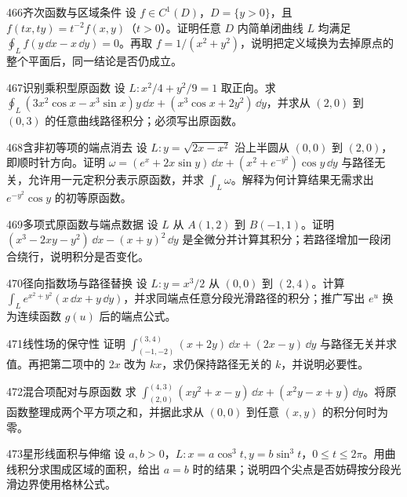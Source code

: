 \begin{exercise}{466}{齐次函数与区域条件}
设 $f\in C^1(D)$，$D=\{y>0\}$，且 $f(tx,ty)=t^{-2}f(x,y)$（$t>0$）。证明任意 $D$ 内简单闭曲线 $L$ 均满足 $\oint_Lf(y\,\dd x-x\,\dd y)=0$。再取 $f=1/(x^2+y^2)$，说明把定义域换为去掉原点的整个平面后，同一结论是否仍成立。
\end{exercise}

\begin{exercise}{467}{识别乘积型原函数}
设 $L:x^2/4+y^2/9=1$ 取正向。求 $\oint_L(3x^2\cos x-x^3\sin x)y\,\dd x+(x^3\cos x+2y^2)\,\dd y$，并求从 $(2,0)$ 到 $(0,3)$ 的任意曲线路径积分；必须写出原函数。
\end{exercise}

\begin{exercise}{468}{含非初等项的端点消去}
设 $L:y=\sqrt{2x-x^2}$ 沿上半圆从 $(0,0)$ 到 $(2,0)$，即顺时针方向。证明 $\omega=(e^x+2x\sin y)\,\dd x+(x^2+e^{-y^2})\cos y\,\dd y$ 与路径无关，允许用一元定积分表示原函数，并求 $\int_L\omega$。解释为何计算结果无需求出 $e^{-y^2}\cos y$ 的初等原函数。
\end{exercise}

\begin{exercise}{469}{多项式原函数与端点数据}
设 $L$ 从 $A(1,2)$ 到 $B(-1,1)$。证明 $(x^3-2xy-y^2)\,\dd x-(x+y)^2\,\dd y$ 是全微分并计算其积分；若路径增加一段闭合绕行，说明积分是否变化。
\end{exercise}

\begin{exercise}{470}{径向指数场与路径替换}
设 $L:y=x^3/2$ 从 $(0,0)$ 到 $(2,4)$。计算 $\int_Le^{x^2+y^2}(x\,\dd x+y\,\dd y)$，并求同端点任意分段光滑路径的积分；推广写出 $e^u$ 换为连续函数 $g(u)$ 后的端点公式。
\end{exercise}

\begin{exercise}{471}{线性场的保守性}
证明 $\int_{(-1,-2)}^{(3,4)}(x+2y)\,\dd x+(2x-y)\,\dd y$ 与路径无关并求值。再把第二项中的 $2x$ 改为 $kx$，求仍保持路径无关的 $k$，并说明必要性。
\end{exercise}

\begin{exercise}{472}{混合项配对与原函数}
求 $\int_{(2,0)}^{(4,3)}(xy^2+x-y)\,\dd x+(x^2y-x+y)\,\dd y$。将原函数整理成两个平方项之和，并据此求从 $(0,0)$ 到任意 $(x,y)$ 的积分何时为零。
\end{exercise}

\begin{exercise}{473}{星形线面积与伸缩}
设 $a,b>0$，$L:x=a\cos^3t,y=b\sin^3t$，$0\leq t\leq2\pi$。用曲线积分求围成区域的面积，给出 $a=b$ 时的结果；说明四个尖点是否妨碍按分段光滑边界使用格林公式。
\end{exercise}

